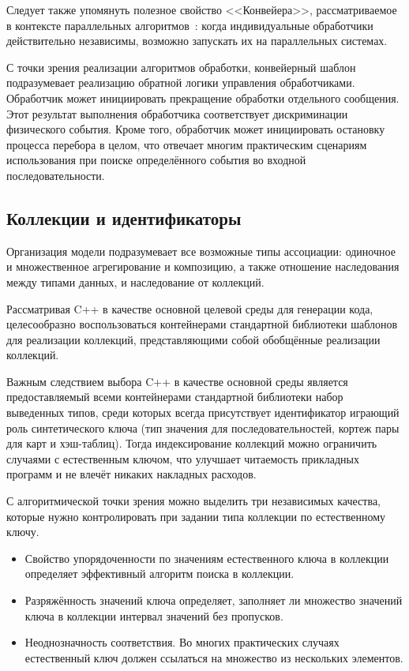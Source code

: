 Следует также упомянуть полезное свойство <<Конвейера>>, рассматриваемое
в контексте параллельных
алгоритмов~\cite{Mattson2005-parallel-patterns, smirnov-besm6}:
когда индивидуальные обработчики действительно независимы, возможно
запускать их на параллельных системах.

С точки зрения реализации алгоритмов обработки, конвейерный шаблон
подразумевает реализацию обратной логики управления обработчиками.
Обработчик может инициировать прекращение обработки отдельного сообщения.
Этот результат выполнения обработчика соответствует
дискриминации физического события. Кроме того, обработчик может
инициировать остановку процесса перебора в целом, что отвечает
многим практическим сценариям использования при поиске определённого
события во входной последовательности.

\subsection{Коллекции и идентификаторы}

Организация модели подразумевает все возможные типы
ассоциации: одиночное и множественное агрегирование и композицию, а
также отношение наследования между типами данных, и наследование от
коллекций. 

Рассматривая C++ в качестве основной целевой среды для генерации кода,
целесообразно воспользоваться контейнерами стандартной библиотеки
шаблонов для реализации коллекций, представляющими собой обобщённые
реализации коллекций.

Важным следствием выбора C++ в качестве основной среды является
предоставляемый всеми контейнерами стандартной библиотеки набор
выведенных типов, среди которых всегда присутствует идентификатор
играющий роль синтетического ключа (тип значения для последовательностей,
кортеж пары для карт и хэш-таблиц). Тогда индексирование коллекций
можно ограничить случаями с естественным ключом, что улучшает
читаемость прикладных программ и не влечёт никаких накладных
расходов.

С алгоритмической точки зрения можно выделить три независимых качества,
которые нужно контролировать при задании типа коллекции по
естественному ключу.
\begin{itemize}
    \item Свойство упорядоченности по значениям естественного ключа
    в коллекции определяет эффективный алгоритм поиска в коллекции.
    \item Разряжённость значений ключа определяет, заполняет ли
    множество значений ключа в коллекции интервал значений без пропусков.
    \item Неоднозначность соответствия.  Во многих практических случаях
    естественный ключ должен ссылаться на множество из нескольких
    элементов.
\end{itemize}

